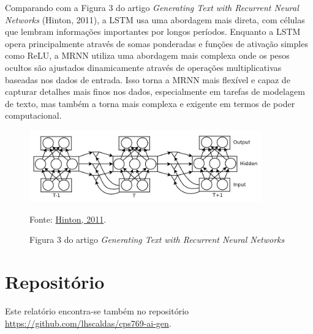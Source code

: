 \documentclass[12 pt]{article}
\begin{document}
Comparando com a Figura 3 do artigo \textit{Generating Text with Recurrent Neural Networks} (Hinton, 2011), a LSTM usa uma abordagem mais direta, com células que lembram informações importantes por longos períodos. Enquanto a LSTM opera principalmente através de somas ponderadas e funções de ativação simples como ReLU, a MRNN utiliza uma abordagem mais complexa onde os pesos ocultos são ajustados dinamicamente através de operações multiplicativas baseadas nos dados de entrada. Isso torna a MRNN mais flexível e capaz de capturar detalhes mais finos nos dados, especialmente em tarefas de modelagem de texto, mas também a torna mais complexa e exigente em termos de poder computacional.

\begin{figure}[H]
    \caption{Figura 3 do artigo \textit{Generating Text with Recurrent Neural Networks}}
    \centering
    \includegraphics[width=10cm]{fig3_hinton2011.jpg}
    \small
    
    Fonte: \href{https://www.researchgate.net/publication/221345823_Generating_Text_with_Recurrent_Neural_Networks}{Hinton, 2011}.
\end{figure}


\section*{Repositório}
Este relatório encontra-se também no repositório \href{https://github.com/lhscaldas/cps769-ai-gen}{https://github.com/lhscaldas/cps769-ai-gen}.
\end{document}

